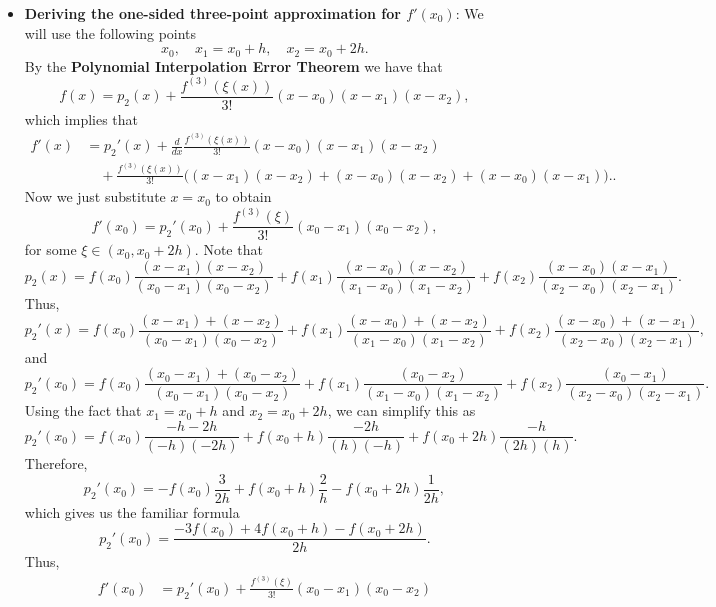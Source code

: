 \documentclass{report}
\begin{document}
\begin{itemize}
        \item \textbf{Deriving the one-sided three-point approximation for $f'(x_0)$}:
            We will use the following points
            $$x_0, \quad x_1 = x_0 + h, \quad x_2 = x_0 + 2h.$$
            By the \textbf{Polynomial Interpolation Error Theorem} we have that
            $$f(x) = p_2(x) + \frac{f^{(3)}(\xi(x))}{3!}(x-x_0)(x-x_1)(x-x_2),$$
            which implies that
            \begin{align*}
                f'(x) &= p_2'(x) + \frac{d}{dx}\frac{f^{(3)}(\xi(x))}{3!} (x-x_0)(x-x_1)(x-x_2) \\
                      & \quad + \frac{f^{(3)}(\xi(x))}{3!}\big((x-x_1)(x-x_2) + (x-x_0)(x-x_2) + (x-x_0)(x-x_1)\big).
            .\end{align*}
            \bigbreak \noindent 
            Now we just substitute $x = x_0$ to obtain
            $$f'(x_0) = p_2'(x_0) + \frac{f^{(3)}(\xi)}{3!}(x_0 - x_1)(x_0 - x_2),$$
            for some $\xi \in (x_0, x_0 + 2h)$.
            \bigbreak \noindent 
            Note that 
            $$p_2(x) = 
            f(x_0) \frac{(x - x_1)(x - x_2)}{(x_0 - x_1)(x_0 - x_2)} + 
            f(x_1) \frac{(x - x_0)(x - x_2)}{(x_1 - x_0)(x_1 - x_2)} + 
            f(x_2) \frac{(x - x_0)(x - x_1)}{(x_2 - x_0)(x_2 - x_1)}.$$
            Thus,
            $$p_2'(x) = 
            f(x_0) \frac{(x - x_1) + (x - x_2)}{(x_0 - x_1)(x_0 - x_2)} + 
            f(x_1) \frac{(x - x_0) + (x - x_2)}{(x_1 - x_0)(x_1 - x_2)} + 
            f(x_2) \frac{(x - x_0) + (x - x_1)}{(x_2 - x_0)(x_2 - x_1)},$$
            and
            $$p_2'(x_0) = 
            f(x_0) \frac{(x_0 - x_1) + (x_0 - x_2)}{(x_0 - x_1)(x_0 - x_2)} + 
            f(x_1) \frac{(x_0 - x_2)}{(x_1 - x_0)(x_1 - x_2)} + 
            f(x_2) \frac{(x_0 - x_1)}{(x_2 - x_0)(x_2 - x_1)}.$$
            \bigbreak \noindent 
            Using the fact that $x_1 = x_0 + h$ and $x_2 = x_0 + 2h$, we can simplify this as
            $$p_2'(x_0) = 
            f(x_0) \frac{-h -2h}{(-h)(-2h)} + 
            f(x_0 + h) \frac{-2h}{(h)(-h)} + 
            f(x_0 + 2h) \frac{-h}{(2h)(h)}.$$
            Therefore,
            $$p_2'(x_0) = - f(x_0) \frac{3}{2h} + f(x_0 + h) \frac{2}{h} - f(x_0 + 2h) \frac{1}{2h},$$
            which gives us the familiar formula
            $$p_2'(x_0) = \frac{- 3f(x_0) + 4f(x_0 + h) - f(x_0 + 2h)}{2h}.$$
            \bigbreak \noindent 
            Thus,
            \begin{align*}
                f'(x_0) 
&= p_2'(x_0) + \frac{f^{(3)}(\xi)}{3!}(x_0 - x_1)(x_0 - x_2) \\

\end{align*}
\end{itemize}
\end{document}
